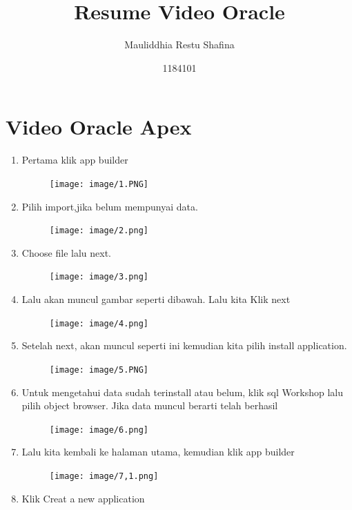 \documentclass{article}
\title{Resume Video Oracle}
\author{Mauliddhia Restu Shafina}
\date{1184101}
\begin{document}
\maketitle

\section{Video Oracle Apex}
\begin{enumerate}
    \item Pertama klik app builder
    \begin{figure}[h]
            \centerline{\texttt{[image: image/1.PNG]}}
            \end{figure}
    \item Pilih import,jika belum mempunyai data.
    \begin{figure}[h]
            \centerline{\texttt{[image: image/2.png]}}
            \end{figure}
    \newpage\item Choose file lalu next.
    \begin{figure}[h]
            \centerline{\texttt{[image: image/3.png]}}
            \end{figure}
    \item	Lalu akan muncul gambar seperti dibawah. Lalu kita Klik next
    \begin{figure}[h]
            \centerline{\texttt{[image: image/4.png]}}
            \end{figure}
    \item Setelah next, akan muncul seperti ini kemudian kita pilih install application.
    \begin{figure}[h]
            \centerline{\texttt{[image: image/5.PNG]}}
            \end{figure}
    \newpage \item Untuk mengetahui data sudah terinstall atau belum, klik sql Workshop lalu pilih object browser. Jika data muncul berarti telah berhasil
    \begin{figure}[h]
            \centerline{\texttt{[image: image/6.png]}}
            \end{figure}
    \newpage \item Lalu kita kembali ke halaman utama, kemudian klik app builder
    \begin{figure}[h]
            \centerline{\texttt{[image: image/7,1.png]}}
            \end{figure}
    \item Klik Creat a new application

\end{enumerate}
\end{document}
